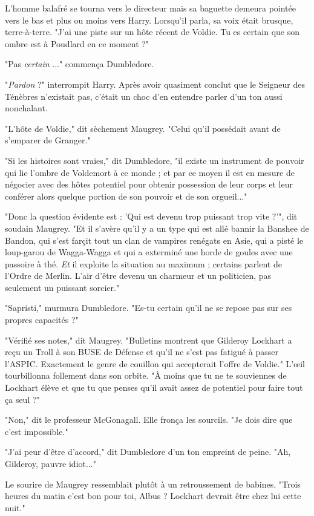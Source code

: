 L'homme balafré se tourna vers le directeur mais sa baguette demeura pointée vers le bas et plus ou moins vers Harry. Lorsqu'il parla, sa voix était brusque, terre-à-terre. "J'ai une piste sur un hôte récent de Voldie. Tu es certain que son ombre est à Poudlard en ce moment ?"

"Pas \emph{certain} ..." commença Dumbledore.

"\emph{Pardon}  ?" interrompit Harry. Après avoir quasiment conclut que le Seigneur des Ténèbres n'existait pas, c'était un choc d'en entendre parler d'un ton aussi nonchalant.

"L'hôte de Voldie," dit sèchement Maugrey. "Celui qu'il possédait avant de s'emparer de Granger."

"Si les histoires sont vraies," dit Dumbledore, "il existe un instrument de pouvoir qui lie l'ombre de Voldemort à ce monde ; et par ce moyen il est en mesure de négocier avec des hôtes potentiel pour obtenir possession de leur corps et leur conférer alors quelque portion de son pouvoir et de son orgueil..."

"Donc la question évidente est : 'Qui est devenu trop puissant trop vite ?'", dit soudain Maugrey. "Et il s'avère qu'il y a un type qui est allé bannir la Banshee de Bandon, qui s'est farçit tout un clan de vampires renégats en Asie, qui a pisté le loup-garou de Wagga-Wagga et qui a exterminé une horde de goules avec une passoire à thé. \emph{Et}  il exploite la situation au maximum ; certains parlent de l'Ordre de Merlin. L'air d'être devenu un charmeur et un politicien, pas seulement un puissant sorcier."

"Sapristi," murmura Dumbledore. "Es-tu certain qu'il ne se repose pas sur ses propres capacités ?"

"Vérifié ses notes," dit Maugrey. "Bulletins montrent que Gilderoy Lockhart a reçu un Troll à son BUSE de Défense et qu'il ne s'est pas fatigué à passer l'ASPIC. Exactement le genre de couillon qui accepterait l'offre de Voldie." L'œil tourbillonna follement dans son orbite. "À moins que tu ne te souviennes de Lockhart élève et que tu que penses qu'il avait assez de potentiel pour faire tout ça seul ?"

"Non," dit le professeur McGonagall. Elle fronça les sourcils. "Je dois dire que c'est impossible."

"J'ai peur d'être d'accord," dit Dumbledore d'un ton empreint de peine. "Ah, Gilderoy, pauvre idiot..."

Le sourire de Maugrey ressemblait plutôt à un retroussement de babines. "Trois heures du matin c'est bon pour toi, Albus ? Lockhart devrait être chez lui cette nuit."

